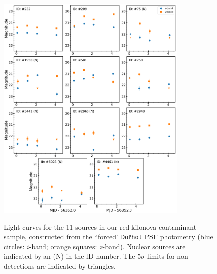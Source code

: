 \begin{figure}[!t]
\begin{center}
\hspace*{-0.1in}
\scalebox{1.}
{\includegraphics[width=0.825\textwidth]{./figs/chapter3/f4.pdf}}
\caption{\singlespace Light curves for the 11 sources in our red kilonova contaminant sample, constructed from the ``forced" {\tt DoPhot} PSF photometry (blue circles: $i$-band; orange squares: $z$-band). Nuclear sources are indicated by an (N) in the ID number. The $5\sigma$ limits for non-detections are indicated by triangles.}
\label{fig:ch3_final_lc_red}
\end{center}
\vspace{0.5cm}
\end{figure}


